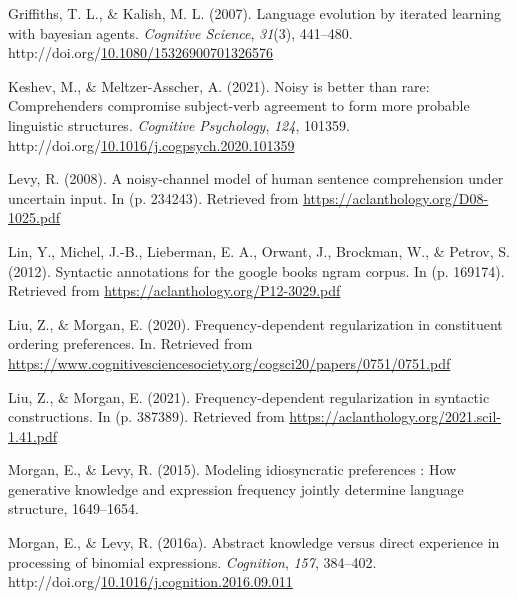 \documentclass[10pt, letterpaper]{article}
\newenvironment{CSLReferences}%
  {}%
  {\par}
\begin{document}
\begin{CSLReferences}{1}{0}
\leavevmode{}%
Griffiths, T. L., \& Kalish, M. L. (2007). Language evolution by
iterated learning with bayesian agents. \emph{Cognitive Science},
\emph{31}(3), 441--480.
http://doi.org/\href{https://doi.org/10.1080/15326900701326576}{10.1080/15326900701326576}

\leavevmode{}%
Keshev, M., \& Meltzer-Asscher, A. (2021). Noisy is better than rare:
Comprehenders compromise subject-verb agreement to form more probable
linguistic structures. \emph{Cognitive Psychology}, \emph{124}, 101359.
http://doi.org/\href{https://doi.org/10.1016/j.cogpsych.2020.101359}{10.1016/j.cogpsych.2020.101359}

\leavevmode{}%
Levy, R. (2008). A noisy-channel model of human sentence comprehension
under uncertain input. In (p. 234243). Retrieved from
\url{https://aclanthology.org/D08-1025.pdf}

\leavevmode{}%
Lin, Y., Michel, J.-B., Lieberman, E. A., Orwant, J., Brockman, W., \&
Petrov, S. (2012). Syntactic annotations for the google books ngram
corpus. In (p. 169174). Retrieved from
\url{https://aclanthology.org/P12-3029.pdf}

\leavevmode{}%
Liu, Z., \& Morgan, E. (2020). Frequency-dependent regularization in
constituent ordering preferences. In. Retrieved from
\url{https://www.cognitivesciencesociety.org/cogsci20/papers/0751/0751.pdf}

\leavevmode{}%
Liu, Z., \& Morgan, E. (2021). Frequency-dependent regularization in
syntactic constructions. In (p. 387389). Retrieved from
\url{https://aclanthology.org/2021.scil-1.41.pdf}

\leavevmode{}%
Morgan, E., \& Levy, R. (2015). Modeling idiosyncratic preferences : How
generative knowledge and expression frequency jointly determine language
structure, 1649--1654.

\leavevmode{}%
Morgan, E., \& Levy, R. (2016a). Abstract knowledge versus direct
experience in processing of binomial expressions. \emph{Cognition},
\emph{157}, 384--402.
http://doi.org/\href{https://doi.org/10.1016/j.cognition.2016.09.011}{10.1016/j.cognition.2016.09.011}


\end{CSLReferences}
\end{document}
